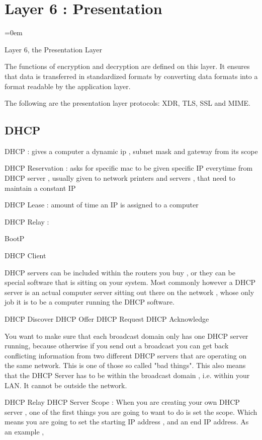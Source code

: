 
\section{Layer 6 : Presentation}
\label{sec:layer_6_presentation}
\parindent=0em

Layer 6, the Presentation Layer

The functions of encryption and decryption are defined on this layer. It ensures that data is transferred in standardized formats by converting data formats into a format readable by the application layer.

The following are the presentation layer protocols: XDR, TLS, SSL and MIME.

\subsection{DHCP}
\label{ssec:dhcp}

DHCP : gives a computer a dynamic ip , subnet mask and gateway from its scope

DHCP Reservation : asks for specific mac to be given specific IP everytime from
DHCP server , usually given to network printers and servers , that need to
maintain a constant IP

DHCP Lease : amount of time an IP is assigned to a computer

DHCP Relay : 

BootP

DHCP Client

DHCP servers can be included within the routers you buy , or they can be special
software that is sitting on your system. Most commonly however a DHCP server is
an actual computer server sitting out there on the network , whose only job it
is to be a computer running the DHCP software.

DHCP Discover
DHCP Offer
DHCP Request
DHCP Acknowledge

You want to make sure that each broadcast domain only has one DHCP server
running, because otherwise if you send out a broadcast you can get back
conflicting information from two different DHCP servers that are operating on
the same network. This is one of those so called "bad things". This also means
that the DHCP Server has to be within the broadcast domain , i.e. within your
LAN. It cannot be outside the network.

DHCP Relay
DHCP Server Scope : When you are creating your own DHCP server , one of the
first things you are going to want to do is set the scope. Which means you are
going to set the starting IP address , and an end IP address. As an example , 

